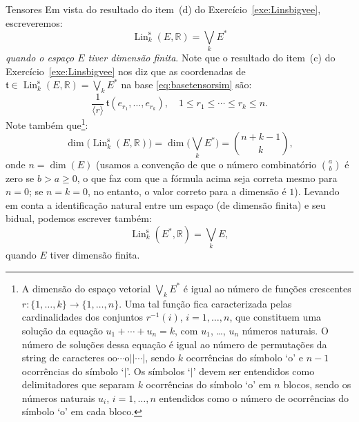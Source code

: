 \documentclass[oneside,11pt]{amsart}
\newcommand{\R}{\mathds R}
\DeclareMathOperator{\Lin}{Lin}
\DeclareMathOperator{\Dim}{dim}
\theoremstyle{remark}\newtheorem{exercise}{Exercício}[section]
\theoremstyle{plain}\newtheorem{teo}{Teorema}[section]
\theoremstyle{plain}\newtheorem{lem}[teo]{Lema}
\theoremstyle{plain}\newtheorem{prop}[teo]{Proposição}
\theoremstyle{definition}\newtheorem{defin}[teo]{Definição}
\theoremstyle{remark}\newtheorem{rem}[teo]{Observação}
\theoremstyle{definition}\newtheorem{example}[teo]{Exemplo}
\numberwithin{equation}{section}
\begin{document}
\begin{section}{Tensores}
Em vista do resultado do item~(d) do Exercício~\ref{exe:Linsbigvee}, escreveremos:
\[\Lin_k^{\mathrm s}(E,\R)=\bigvee_kE^*\]
{\em quando o espaço $E$ tiver dimensão finita}. Note que o resultado do item~(c) do Exercício~\ref{exe:Linsbigvee}
nos diz que as coordenadas de $\mathfrak t\in\Lin_k^{\mathrm s}(E,\R)=\bigvee_kE^*$ na base \eqref{eq:basetensorsim} são:
\[\frac1{\langle r\rangle}\,\mathfrak t(e_{r_1},\ldots,e_{r_k}),\quad1\le r_1\le\cdots\le r_k\le n.\]
Note também que\footnote{%
A dimensão do espaço vetorial $\bigvee_kE^*$ é igual ao número de funções crescentes $r:\{1,\ldots,k\}\to\{1,\ldots,n\}$. Uma tal função fica caracterizada
pelas cardinalidades dos conjuntos $r^{-1}(i)$, $i=1,\ldots,n$, que constituem uma solução da equação $u_1+\cdots+u_n=k$, com $u_1$, \dots, $u_n$
números naturais. O número de soluções dessa equação é igual ao número de permutações da string de caracteres $\mathrm o\mathrm o\cdots\mathrm o||\cdots|$,
sendo $k$ ocorrências do símbolo `$\mathrm o$' e $n-1$ ocorrências do símbolo `$|$'. Os símbolos `$|$' devem ser entendidos como delimitadores que separam
$k$ ocorrências do símbolo `$\mathrm o$' em $n$ blocos, sendo os números naturais $u_i$, $i=1,\ldots,n$ entendidos como o número de ocorrências do símbolo
`$\mathrm o$' em cada bloco.}:
\[\Dim\!\big(\!\Lin_k^{\mathrm s}(E,\R)\big)=\Dim\!\Big(\bigvee_kE^*\Big)=\binom{n+k-1}k,\]
onde $n=\Dim(E)$ (usamos a convenção de que o número combinatório $\binom ab$ é zero se $b>a\ge0$, o que faz com que a fórmula acima seja correta mesmo
para $n=0$; se $n=k=0$, no entanto, o valor correto para a dimensão é $1$).
Levando em conta a identificação natural entre um espaço (de dimensão finita) e seu bidual, podemos escrever também:
\[\Lin_k^{\mathrm s}(E^*,\R)=\bigvee_kE,\]
quando $E$ tiver dimensão finita.


\end{section}
\end{document}
